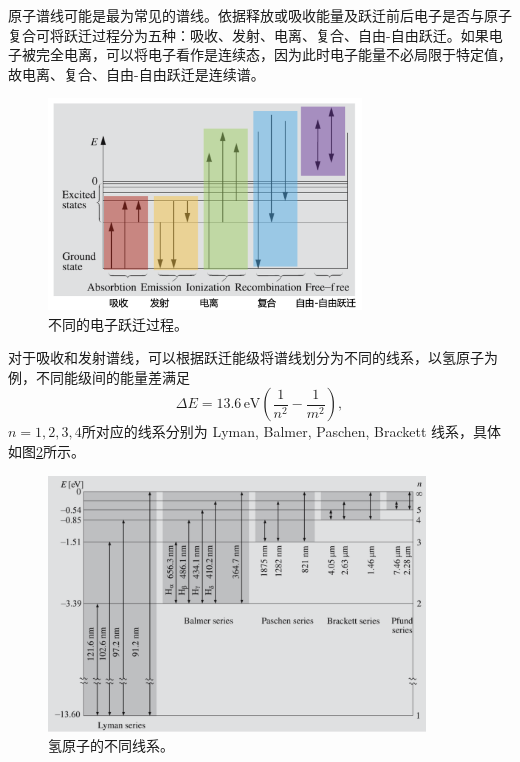 \documentclass[../天体物理基础.tex]{subfiles}
\begin{document}
原子谱线可能是最为常见的谱线。依据释放或吸收能量及跃迁前后电子是否与原子复合可将跃迁过程分为五种：吸收、发射、电离、复合、自由{}-{}自由跃迁。如果电子被完全电离，可以将电子看作是连续态，因为此时电子能量不必局限于特定值，故电离、复合、自由{}-{}自由跃迁是连续谱。
\begin{figure}[!htbp]
\centering
\includegraphics[width=8.3cm]{figures/figure1_10.png}
\captionsetup{justification=raggedright, singlelinecheck=false}
\caption{不同的电子跃迁过程。}
\label{不同的电子跃迁过程。}
\end{figure}

对于吸收和发射谱线，可以根据跃迁能级将谱线划分为不同的线系，以氢原子为例，不同能级间的能量差满足
\begin{equation}
\Delta{}E=13.6\,\mathrm{eV}\left(\frac{1}{n^{2}}-\frac{1}{m^{2}}\right),
\end{equation}
$n=1,2,3,4$所对应的线系分别为 Lyman, Balmer, Paschen, Brackett 线系，具体如图\ref{氢原子的不同线系。}所示。

\begin{figure}[!htbp]
\centering
\includegraphics[width=10cm]{figures/figure1_11.png}
\captionsetup{justification=raggedright, singlelinecheck=false}
\caption{氢原子的不同线系。}
\label{氢原子的不同线系。}
\end{figure}
\end{document}
